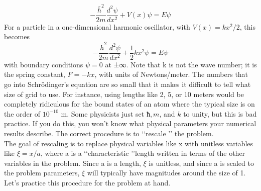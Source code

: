\documentclass{book}
\theoremstyle{plain}
\theoremstyle{definition}
\numberwithin{exm}{chapter}
\theoremstyle{remark}
\theoremstyle{summary}
\theoremstyle{overview}
\begin{document}
\begin{equation}\label{eq:410}
-\frac{\bar{h}^{2}}{2 m} \frac{d^{2} \psi}{d x^{2}}+V(x) \psi=E \psi
\end{equation}
For a particle in a one-dimensional harmonic oscillator, with $V (x) = kx^2/2$, this
becomes
\begin{equation}\label{eq:411}
-\frac{\bar{h}^{2}}{2 m} \frac{d^{2} \psi}{d x^{2}}+\frac{1}{2} k x^{2} \psi=E \psi
\end{equation}
with boundary conditions $\psi = 0$ at ±∞. Note that k is not the wave number; it is
the spring constant, $F = −kx$, with units of Newtons/meter.
The numbers that go into Schrödinger’s equation are so small that it makes
it difficult to tell what size of grid to use. For instance, using lengths like 2, 5, or
10 meters would be completely ridiculous for the bound states of an atom where
the typical size is on the order of $10^{−10}$ m. Some physicists just set $ħ, m$, and $k$
to unity, but this is bad practice. If you do this, you won\rq t know what physical
parameters your numerical results describe. The correct procedure is to \lq\lq rescale \rq\rq
the problem. \\ 
The goal of rescaling is to replace physical variables like x with unitless variables like $\xi = x/a$, where a is a \lq\lq characteristic \rq\rq length written in terms of the other
variables in the problem. Since a is a length, $\xi$ is unitless, and since a is scaled
to the problem parameters, $\xi$ will typically have magnitudes around the size of 1.
Let\rq s practice this procedure for the problem at hand.
\end{document}
